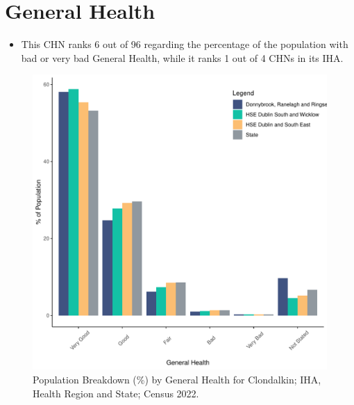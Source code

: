 \documentclass{article}
\begin{document}
\pagebreak

\section{General Health}\label{sect:GenHealth}
\begin{itemize}
\item  This CHN ranks  6 out of 96 regarding the percentage of the population with bad or very bad General Health, while it ranks   1 out of 4 CHNs in its IHA.
\end{itemize}
\begin{figure}[h]
	\centering
	\includegraphics[width = 150mm]{../figures/GenED.pdf}
	\caption{Population Breakdown (\%) by General Health for Clondalkin; IHA, Health Region and State;  Census 2022.}
	\label{fig:2ae19629-1a6a-13a3-e055-000000000001}
	\end{figure}
\end{document}
